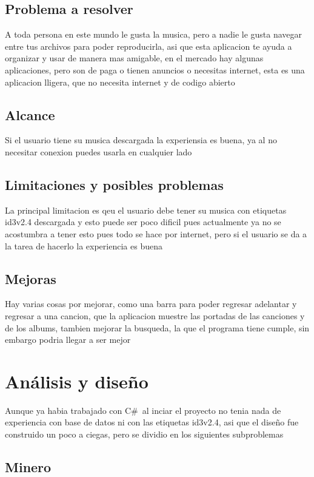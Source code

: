 \documentclass{article}
\begin{document}
\subsection{Problema a resolver}
A toda persona en este mundo le gusta la musica, pero a nadie le gusta navegar entre tus archivos para poder reproducirla, asi que esta aplicacion te ayuda a organizar y usar de manera mas amigable, en el mercado hay algunas aplicaciones, pero son de paga o tienen anuncios o necesitas internet, esta es una aplicacion lligera, que no necesita internet y de codigo abierto

\subsection{Alcance}
Si el usuario tiene su musica descargada la experiensia es buena, ya  al no necesitar conexion puedes usarla en cualquier lado

\subsection{Limitaciones y posibles problemas}
La principal limitacion es qeu el usuario debe tener su musica con etiquetas id3v2.4 descargada y esto puede ser poco dificil pues actualmente ya no se acostumbra a tener esto pues todo se hace por internet, pero si el usuario se da a la tarea de hacerlo la experiencia es buena

\subsection{Mejoras}

Hay varias cosas por mejorar, como una barra para poder regresar adelantar y regresar a una cancion, que la aplicacion muestre las portadas de las canciones y de los albums, tambien mejorar la busqueda, la que el programa tiene cumple, sin embargo podria llegar a ser mejor
\section{Análisis y diseño}
\label{sec:analisis-y-diseno}

 Aunque ya habia trabajado con C\#\ al inciar el proyecto no tenia nada de experiencia con base de datos ni con las etiquetas id3v2.4, asi que el diseño fue construido un poco a ciegas, pero se dividio en los siguientes subproblemas
 
\subsection{Minero}
\end{document}
